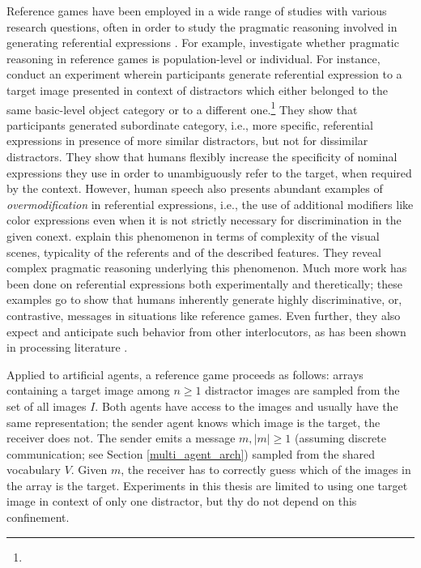Reference games have been employed in a wide range of studies with various research questions, often in order to study the pragmatic reasoning involved in generating referential expressions . For example, \cite{franke2016reasoning} investigate whether pragmatic reasoning in reference games is population-level or individual.  For instance, \cite{graf2016animal} conduct an experiment wherein participants generate referential expression to a target image presented in context of distractors which either belonged to the same basic-level object category or to a different one.\footnote{} They show that participants generated subordinate category, i.e., more specific, referential expressions in presence of more similar distractors, but not for dissimilar distractors. They show that humans flexibly increase the specificity of nominal expressions they use in order to unambiguously refer to the target, when required by the context. However, human speech also presents abundant examples of \textit{overmodification} in referential expressions, i.e., the use of additional modifiers like color expressions even when it is not strictly necessary for discrimination in the given conext. \cite{degen2020redundancy} explain this phenomenon in terms of complexity of the visual scenes, typicality of the referents and of the described features. They reveal complex pragmatic reasoning underlying this phenomenon. Much more work has been done on referential expressions both experimentally and theretically; these examples go to show that humans inherently generate highly discriminative, or, contrastive, messages in situations like reference games. Even further, they also expect and anticipate such behavior from other interlocutors, as has been shown in processing literature \parencite[e. g., cf.]{sedivy1999achieving}.

Applied to artificial agents, a reference game proceeds as follows: arrays containing a target image among $n \geq 1$ distractor images are sampled from the set of all images $I$. Both agents have access to the images and usually have the same representation; the sender agent knows which image is the target, the receiver does not. The sender emits a message $m, |m| \geq 1$ (assuming discrete communication; see Section \ref{multi_agent_arch}) sampled from the shared vocabulary $V$. Given $m$, the receiver has to correctly guess which of the images in the array is the target. Experiments in this thesis are limited to using one target image in context of only one distractor, but thy do not depend on this confinement.

